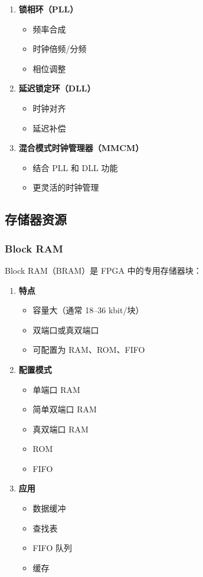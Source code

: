\begin{enumerate}
  \item \textbf{锁相环（PLL）}
    \begin{itemize}
      \item 频率合成
      \item 时钟倍频/分频
      \item 相位调整
    \end{itemize}

  \item \textbf{延迟锁定环（DLL）}
    \begin{itemize}
      \item 时钟对齐
      \item 延迟补偿
    \end{itemize}

  \item \textbf{混合模式时钟管理器（MMCM）}
    \begin{itemize}
      \item 结合 PLL 和 DLL 功能
      \item 更灵活的时钟管理
    \end{itemize}
\end{enumerate}

\subsection{存储器资源}

\subsubsection{Block RAM}

Block RAM（BRAM）是 FPGA 中的专用存储器块：

\begin{enumerate}
  \item \textbf{特点}
    \begin{itemize}
      \item 容量大（通常 18--36 kbit/块）
      \item 双端口或真双端口
      \item 可配置为 RAM、ROM、FIFO
    \end{itemize}

  \item \textbf{配置模式}
    \begin{itemize}
      \item 单端口 RAM
      \item 简单双端口 RAM
      \item 真双端口 RAM
      \item ROM
      \item FIFO
    \end{itemize}

  \item \textbf{应用}
    \begin{itemize}
      \item 数据缓冲
      \item 查找表
      \item FIFO 队列
      \item 缓存
    \end{itemize}
\end{enumerate}

